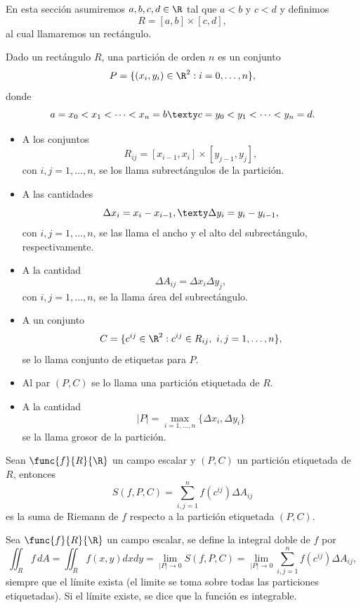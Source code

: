 \documentclass[a4,11pt]{aleph-notas}
\begin{document}

En esta sección asumiremos $a,b,c,d\in\R$ tal que $a<b$ y $c<d$ y definimos
\[
    R=[a,b]\times [c,d],
\]
al cual llamaremos un rectángulo.

\begin{defi}
    Dado un rectángulo $R$, una partición de orden $n$ es un conjunto
    \[
        P=\{(x_i,y_i)\in\R^2:i=0,\ldots,n\},
    \]
    donde
    \[
        a=x_0<x_1<\cdots<x_n=b
    \texty
        c=y_0<y_1<\cdots<y_n=d.
    \]
    \begin{itemize}
    \item 
        A los conjuntos 
        \[
            R_{ij}=[x_{i-1},x_i]\times[y_{j-1},y_j],
        \]
        con $i,j=1,\ldots,n$, se los llama subrectángulos de la partición.
    \item 
        A las cantidades
        \[
            \Delta x_i=x_i-x_{i-1},
            \texty
            \Delta y_i=y_i-y_{i-1},
        \]
        con $i,j=1,\ldots,n$, se las llama el ancho y el alto del subrectángulo, respectivamente.
    \item
        A la cantidad
        \[
            \Delta A_{ij} = \Delta x_i\Delta y_j,
        \]
        con $i,j=1,\ldots,n$, se la llama área del subrectángulo.
    \item 
        A un conjunto
        \[
            C = \{c^{ij}\in\R^2: c^{ij}\in R_{ij},\ i,j=1,\ldots,n\},
        \]
        se lo llama conjunto de etiquetas para $P$.
    \item 
        Al par $(P,C)$ se lo llama una partición etiquetada de $R$.
    \item
        A la cantidad
        \[
            |P| = \max_{i=1,\ldots,n}\{\Delta x_i,\Delta y_i\}
        \]
        se la llama grosor de la partición.
    \end{itemize}
\end{defi}

\begin{defi}
    Sean $\func{f}{R}{\R}$ un campo escalar y $(P,C)$ un partición etiquetada de $R$, entonces
    \[
        S(f,P,C) = \sum_{i,j=1}^n f(c^{ij})\Delta A_{ij}
    \]
    es la suma de Riemann de $f$ respecto a la partición etiquetada $(P,C)$.
\end{defi}

\begin{defi}
    Sea $\func{f}{R}{\R}$ un campo escalar, se define la integral doble de $f$ por
    \[
        \iint_R f\, dA =\iint_R f(x,y)dxdy 
        = \lim_{|P|\to 0} S(f,P,C) 
        = \lim_{|P|\to 0} \sum_{i,j=1}^n f(c^{ij})\Delta A_{ij},
    \]
    siempre que el límite exista (el limite se toma sobre todas las particiones etiquetadas). Si el límite existe, se dice que la función es integrable.
\end{defi}
\end{document}
